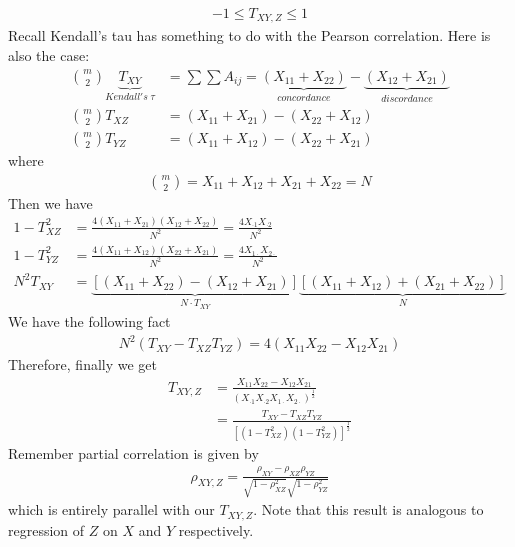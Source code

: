 \documentclass[twoside]{article}
\begin{document}
	\begin{align*}
		-1 \leqslant T_{XY, Z} \leqslant 1
	\end{align*}
	Recall Kendall's tau has something to do with the Pearson correlation. Here is also the case: 
	\begin{align*}
		\binom{m}{2} \underbrace{T_{XY}}_{Kendall's \; \tau} &= \sum \sum A_{ij} = \underbrace{\left( X_{11} + X_{22} \right)}_{concordance} - \underbrace{\left( X_{12} + X_{21} \right)}_{discordance} \\
		\binom{m}{2} T_{XZ} &= \left( X_{11} + X_{21} \right) - \left( X_{22} + X_{12} \right) \\
		\binom{m}{2} T_{YZ} &= \left( X_{11} + X_{12} \right) - \left( X_{22} + X_{21} \right)
	\end{align*}
	where
	\begin{align*}
		\binom{m}{2} = X_{11} + X_{12} + X_{21} + X_{22} = N
	\end{align*}
	Then we have
	\begin{align*}
		1 - T_{XZ}^{2} &= \frac{4 \left( X_{11} + X_{21} \right) \left( X_{12} + X_{22} \right)}{N^2} = \frac{4 X_{\cdot 1} X_{\cdot 2}}{N^2} \\
		1 - T_{YZ}^{2} &= \frac{4 \left( X_{11} + X_{12} \right) \left( X_{22} + X_{21} \right)}{N^2} = \frac{4 X_{1 \cdot} X_{2 \cdot}}{N^2} \\
		N^2 T_{XY} &= \underbrace{ \left[ \left( X_{11} + X_{22} \right) - \left( X_{12} + X_{21} \right) \right]}_{N \cdot T_{XY}} \underbrace{ \left[ \left( X_{11} + X_{12} \right) + \left( X_{21} + X_{22} \right) \right]}_{N} 
	\end{align*}
	We have the following fact
	\begin{align*}
		N^2 \left( T_{XY} - T_{XZ} T_{YZ} \right) = 4 \left( X_{11} X_{22} - X_{12} X_{21} \right)
	\end{align*}
	Therefore, finally we get
	\begin{align*}
		T_{XY,Z} &= \frac{X_{11} X_{22} - X_{12} X_{21}}{\left( X_{\cdot 1} X_{\cdot 2} X_{1 \cdot} X_{2 \cdot} \right)^{\frac{1}{2}}} \\
		&= \frac{T_{XY} - T_{XZ} T_{YZ}}{ \left[ \left( 1 - T_{XZ}^2 \right) \left( 1 - T_{YZ}^2 \right) \right]^{\frac{1}{2}}}
	\end{align*}
	Remember partial correlation is given by
	\begin{align*}
		\rho_{XY, Z} = \frac{\rho_{XY} - \rho_{XZ} \rho_{YZ}}{\sqrt{1 - \rho_{XZ}^2} \sqrt{1 - \rho_{YZ}^2}}
	\end{align*}
	which is entirely parallel with our $T_{XY, Z}$. Note that this result is analogous to regression of $Z$ on $X$ and $Y$ respectively. 
\end{document}
